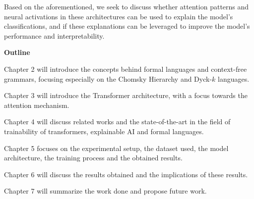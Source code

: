 Based on the aforementioned, we seek to discuss whether attention patterns and neural activations in these architectures can be used to explain the model's classifications, and if these explanations can be leveraged to improve the model's performance and interpretability.

\bigskip

\textbf{Outline}

Chapter 2 will introduce the concepts behind formal languages and context-free grammars, focusing especially on the Chomsky Hierarchy and Dyck-$k$ languages.

Chapter 3 will introduce the Transformer architecture, with a focus towards the attention mechanism.

Chapter 4 will discuss related works and the state-of-the-art in the field of trainability of transformers, explainable AI and formal languages.

Chapter 5 focuses on the experimental setup, the dataset used, the model architecture, the training process and the obtained results.

Chapter 6 will discuss the results obtained and the implications of these results.

Chapter 7 will summarize the work done and propose future work.